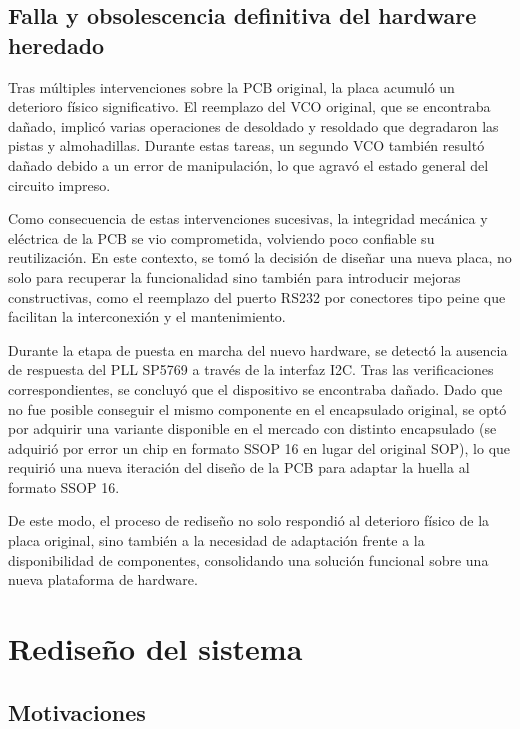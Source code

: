 \documentclass[12pt, a4paper]{article}
\begin{document}
	\subsection{Falla y obsolescencia definitiva del hardware heredado}
	
	Tras múltiples intervenciones sobre la PCB original, la placa acumuló un deterioro físico significativo.
	El reemplazo del VCO original, que se encontraba dañado, implicó varias operaciones de desoldado y
	resoldado que degradaron las pistas y almohadillas. Durante estas tareas, un segundo VCO también
	resultó dañado debido a un error de manipulación, lo que agravó el estado general del circuito impreso.
	
	Como consecuencia de estas intervenciones sucesivas, la integridad mecánica y eléctrica de la PCB se
	vio comprometida, volviendo poco confiable su reutilización. En este contexto, se tomó la decisión de
	diseñar una nueva placa, no solo para recuperar la funcionalidad sino también para introducir mejoras
	constructivas, como el reemplazo del puerto RS232 por conectores tipo peine que facilitan la
	interconexión y el mantenimiento.
	
	Durante la etapa de puesta en marcha del nuevo hardware, se detectó la ausencia de respuesta del
	PLL SP5769 a través de la interfaz I2C. Tras las
	verificaciones correspondientes, se concluyó que el dispositivo se encontraba dañado. Dado que no fue
	posible conseguir el mismo componente en el encapsulado original, se optó por adquirir una variante
	disponible en el mercado con distinto encapsulado (se adquirió por error un chip en formato SSOP 16 en lugar del original SOP), lo que requirió una nueva iteración del diseño de la
	PCB para adaptar la huella al formato SSOP 16.
	
	De este modo, el proceso de rediseño no solo respondió al deterioro físico de la placa original, sino
	también a la necesidad de adaptación frente a la disponibilidad de componentes, consolidando una
	solución funcional sobre una nueva plataforma de hardware.
	\section{Rediseño del sistema}
	
	\subsection{Motivaciones}
	
\end{document}
